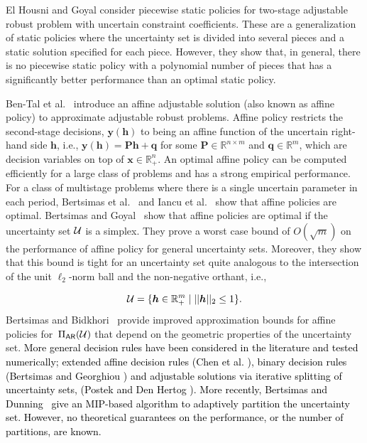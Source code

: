 \documentclass[11pt]{article}
\theoremstyle{plain}
\theoremstyle{definition}
\numberwithin{equation}{section}%
\numberwithin{equation}{section}%
\newcommand{\mb}[1]{\ensuremath{\boldsymbol{#1}}}
\newcommand*{\red}{\textcolor{black}}
\begin{document}
El Housni and Goyal \cite{elhousni2015piecewise} consider piecewise static policies for two-stage adjustable robust problem with uncertain constraint coefficients. These are a generalization of static policies where the uncertainty set is divided into several pieces and a static solution specified for each piece. However, they show that, in general, there is no piecewise static policy with a polynomial number of pieces that has a significantly better performance than an optimal static policy.

Ben-Tal et al.~\cite{Ben-Tal04} introduce an affine adjustable solution (also known as affine policy) to approximate adjustable robust problems. Affine policy restricts the second-stage decisions, $\mb{y}(\mb{h})$ to being an affine function of the uncertain right-hand side $\mb{h}$, i.e.,  $\mb{y}(\mb{h})=\mb{P}\mb{h}+\mb{q}$ for some $\mb{P}\in{\mathbb R}^{n\times m}$ and $\mb{q}\in{\mathbb R}^m$, which are decision variables on top of $\mb x \in {\mathbb R}_+^n$. An optimal affine policy can be computed efficiently for a large class of problems and has a strong empirical performance. For a class of multistage problems where there is a single uncertain parameter in each period, Bertsimas et al.~\cite{BIP09} and Iancu et al.~\cite{ISS13} show that affine policies are optimal. Bertsimas and Goyal~\cite{BG10} show that affine policies are optimal if the uncertainty set ${\cal U}$ is a simplex. They prove a worst case bound of $O(\sqrt{m})$  on the performance of affine policy for general uncertainty sets. Moreover, they show that this bound is tight for an uncertainty set quite analogous to the intersection of the unit $\ell_2$-norm ball and the non-negative orthant, i.e.,

\red{\begin{equation} \label{def:sphere}
{\cal U}=\{\mb{h}\in{\mathbb R}^m_+\;|\;||\mb{h}||_2\leq 1\}.
\end{equation}}
Bertsimas and Bidkhori~\cite{BB15} provide improved approximation bounds for affine policies for~$\Pi_{\sf AR}({\cal U})$ that depend on the geometric properties of the uncertainty set. \red{More general decision rules have been considered in the literature and tested numerically;
extended affine decision rules (Chen et al. \cite{chen2008linear}), binary decision rules (Bertsimas and Georghiou \cite{bertsimas2015design}) and adjustable solutions via iterative splitting of uncertainty sets, (Postek and Den Hertog \cite{postek2016multistage}). More recently, Bertsimas and Dunning~\cite{BD15} give an MIP-based algorithm to adaptively partition the uncertainty set.  However, no theoretical guarantees on the performance, or the number of partitions, are known.
}
\end{document}
